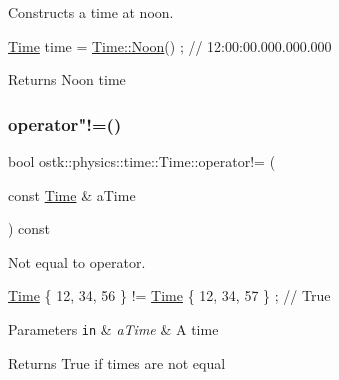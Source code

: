 Constructs a time at noon. 


\begin{DoxyCode}
\hyperlink{classostk_1_1physics_1_1time_1_1_time_a9609e75d328ed240f6fc4529e26038cc}{Time} time = \hyperlink{classostk_1_1physics_1_1time_1_1_time_a2d242e4f07bbf56e51eb2267773042f2}{Time::Noon}() ; \textcolor{comment}{// 12:00:00.000.000.000}
\end{DoxyCode}


\begin{DoxyReturn}{Returns}
Noon time 
\end{DoxyReturn}
\mbox{\label{classostk_1_1physics_1_1time_1_1_time_a0e33fd17972bc71d52b159559f8180c8}} 
\subsubsection{\texorpdfstring{operator"!=()}{operator!=()}}
{\footnotesize\ttfamily bool ostk\+::physics\+::time\+::\+Time\+::operator!= (\begin{DoxyParamCaption}\item[{const \hyperlink{classostk_1_1physics_1_1time_1_1_time}{Time} \&}]{a\+Time }\end{DoxyParamCaption}) const}



Not equal to operator. 


\begin{DoxyCode}
\hyperlink{classostk_1_1physics_1_1time_1_1_time_a9609e75d328ed240f6fc4529e26038cc}{Time} \{ 12, 34, 56 \}  != \hyperlink{classostk_1_1physics_1_1time_1_1_time_a9609e75d328ed240f6fc4529e26038cc}{Time} \{ 12, 34, 57 \} ; \textcolor{comment}{// True}
\end{DoxyCode}



\begin{DoxyParams}[1]{Parameters}
\mbox{\tt in}  & {\em a\+Time} & A time \\
\hline
\end{DoxyParams}
\begin{DoxyReturn}{Returns}
True if times are not equal 
\end{DoxyReturn}
\mbox{\label{classostk_1_1physics_1_1time_1_1_time_ad914e61c2ace9527236f88b897a0c6de}} 
